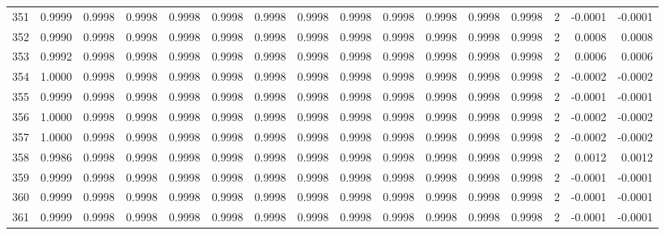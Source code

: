 \begin{tabular}{lrrrrrrrrrrrrrrr}
351 &      0.9999 &  0.9998 &  0.9998 &  0.9998 &  0.9998 &  0.9998 &  0.9998 &  0.9998 &  0.9998 &  0.9998 &   0.9998 &     0.9998 &      2 &                   -0.0001 &                    -0.0001 \\
352 &      0.9990 &  0.9998 &  0.9998 &  0.9998 &  0.9998 &  0.9998 &  0.9998 &  0.9998 &  0.9998 &  0.9998 &   0.9998 &     0.9998 &      2 &                    0.0008 &                     0.0008 \\
353 &      0.9992 &  0.9998 &  0.9998 &  0.9998 &  0.9998 &  0.9998 &  0.9998 &  0.9998 &  0.9998 &  0.9998 &   0.9998 &     0.9998 &      2 &                    0.0006 &                     0.0006 \\
354 &      1.0000 &  0.9998 &  0.9998 &  0.9998 &  0.9998 &  0.9998 &  0.9998 &  0.9998 &  0.9998 &  0.9998 &   0.9998 &     0.9998 &      2 &                   -0.0002 &                    -0.0002 \\
355 &      0.9999 &  0.9998 &  0.9998 &  0.9998 &  0.9998 &  0.9998 &  0.9998 &  0.9998 &  0.9998 &  0.9998 &   0.9998 &     0.9998 &      2 &                   -0.0001 &                    -0.0001 \\
356 &      1.0000 &  0.9998 &  0.9998 &  0.9998 &  0.9998 &  0.9998 &  0.9998 &  0.9998 &  0.9998 &  0.9998 &   0.9998 &     0.9998 &      2 &                   -0.0002 &                    -0.0002 \\
357 &      1.0000 &  0.9998 &  0.9998 &  0.9998 &  0.9998 &  0.9998 &  0.9998 &  0.9998 &  0.9998 &  0.9998 &   0.9998 &     0.9998 &      2 &                   -0.0002 &                    -0.0002 \\
358 &      0.9986 &  0.9998 &  0.9998 &  0.9998 &  0.9998 &  0.9998 &  0.9998 &  0.9998 &  0.9998 &  0.9998 &   0.9998 &     0.9998 &      2 &                    0.0012 &                     0.0012 \\
359 &      0.9999 &  0.9998 &  0.9998 &  0.9998 &  0.9998 &  0.9998 &  0.9998 &  0.9998 &  0.9998 &  0.9998 &   0.9998 &     0.9998 &      2 &                   -0.0001 &                    -0.0001 \\
360 &      0.9999 &  0.9998 &  0.9998 &  0.9998 &  0.9998 &  0.9998 &  0.9998 &  0.9998 &  0.9998 &  0.9998 &   0.9998 &     0.9998 &      2 &                   -0.0001 &                    -0.0001 \\
361 &      0.9999 &  0.9998 &  0.9998 &  0.9998 &  0.9998 &  0.9998 &  0.9998 &  0.9998 &  0.9998 &  0.9998 &   0.9998 &     0.9998 &      2 &                   -0.0001 &                    -0.0001 \\

\end{tabular}
